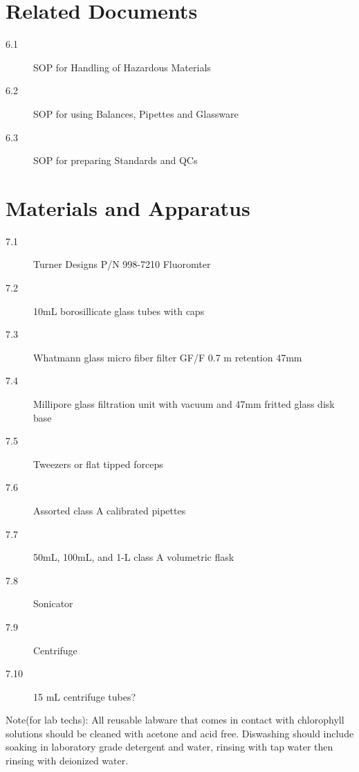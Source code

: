 \documentclass[12pt]{../SOP2}
\begin{document}
\section{Related Documents}
\begin{description}
\item[6.1] SOP for Handling of Hazardous Materials
\item[6.2] SOP for using Balances, Pipettes and Glassware
\item[6.3] SOP for preparing Standards and QCs %
\end{description}

\section{Materials and Apparatus}
\begin{description}
\item[7.1] Turner Designs P/N 998-7210 Fluoromter
\item[7.2] 10mL borosillicate glass tubes with caps
\item[7.3] Whatmann glass micro fiber filter GF/F 0.7 \micro m retention 47mm
\item[7.4] Millipore glass filtration unit with vacuum and 47mm fritted glass disk base
\item[7.5] Tweezers or flat tipped forceps
\item[7.6] Assorted class A calibrated pipettes
\item[7.7] 50mL, 100mL, and 1-L class A volumetric flask
\item[7.8] Sonicator %
\item[7.9] Centrifuge
\item[7.10] 15 mL centrifuge tubes? %
\end{description}

Note(for lab techs): All reusable labware that comes in contact with chlorophyll solutions should be cleaned with acetone and acid free. Diswashing should include soaking in laboratory grade detergent and water, rinsing with tap water then rinsing with deionized water. 
\end{document}
